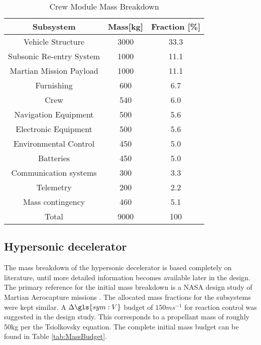 \begin{table}[H]
	\centering
	\caption{Crew Module Mass Breakdown}
	\begin{tabular}{|c|c|c|}
    \hline
    Subsystem        					& Mass[kg] 	& Fraction [\%] \\ \hline \hline
    Vehicle Structure 				& 3000			& 33.3 					\\ \hline 
		Subsonic Re-entry System	& 1000			& 11.1					\\ \hline
		Martian Mission Payload 	& 1000			& 11.1 					\\ \hline
		Furnishing								& 600				& 6.7 					\\ \hline
		Crew											& 540				& 6.0						\\ \hline
		Navigation Equipment			& 500				& 5.6						\\ \hline
		Electronic Equipment 			& 500				& 5.6						\\ \hline
		Environmental Control			& 450				& 5.0						\\ \hline
		Batteries									&	450				&	5.0						\\ \hline
		Communication systems			& 300				& 3.3						\\ \hline
		Telemetry									& 200				& 2.2						\\ \hline
		Mass contingency					&	460				& 5.1						\\ \hline
		Total											&	9000			& 100						\\ \hline
    \end{tabular}
    \label{tab:CVMB}
\end{table}

\subsection{Hypersonic decelerator}
The mass breakdown of the hypersonic decelerator is based completely on literature, until more detailed information becomes available later in the design. The primary reference for the initial mass breakdown is a NASA design study of Martian Aerocapture missions \cite{Cianciolo2010}. The allocated mass fractions for the subsystems were kept similar. A $\Delta \gls{sym:V}$ budget of $150 ms^{-1}$ for reaction control was suggested in the design study. This corresponds to a propellant mass of roughly 50kg per the Tsiolkovsky equation. The complete initial mass budget can be found in Table \ref{tab:MassBudget}. 

